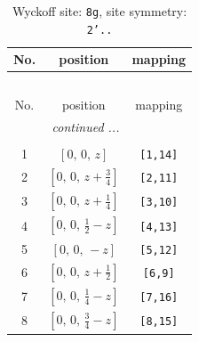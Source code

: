 \documentclass[fleqn,8pt]{jsarticle}
\begin{document}
\renewcommand{\arraystretch}{1.2}
\begin{longtable}{ccc}
\caption{Wyckoff site: {\tt 8g}, site symmetry: {\tt 2'..}}
 \\
 \hline \hline
No. & position & mapping \\ \hline \endfirsthead

\multicolumn{2}{l}{\tablename\ \thetable{}} \\
 \hline \hline
No. & position & mapping \\ \hline \endhead

 \hline \hline
\multicolumn{2}{r}{\footnotesize\it continued ...} \\ \endfoot

 \hline \hline
\multicolumn{2}{r}{} \\ \endlastfoot

1 & $\left[ 0,\, 0,\, z \right]$ & {\tt [1,14]} \\ \hline
2 & $\left[ 0,\, 0,\, z + \frac{3}{4} \right]$ & {\tt [2,11]} \\ \hline
3 & $\left[ 0,\, 0,\, z + \frac{1}{4} \right]$ & {\tt [3,10]} \\ \hline
4 & $\left[ 0,\, 0,\, \frac{1}{2} - z \right]$ & {\tt [4,13]} \\ \hline
5 & $\left[ 0,\, 0,\, - z \right]$ & {\tt [5,12]} \\ \hline
6 & $\left[ 0,\, 0,\, z + \frac{1}{2} \right]$ & {\tt [6,9]} \\ \hline
7 & $\left[ 0,\, 0,\, \frac{1}{4} - z \right]$ & {\tt [7,16]} \\ \hline
8 & $\left[ 0,\, 0,\, \frac{3}{4} - z \right]$ & {\tt [8,15]} \\
\end{longtable}
\renewcommand{\arraystretch}{1.2}
\end{document}

